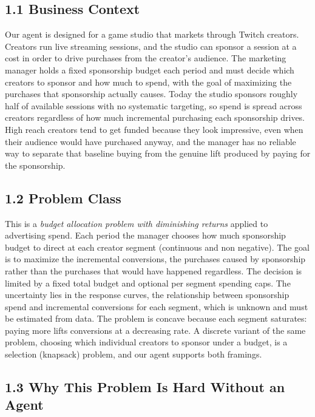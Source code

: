 \documentclass[11pt]{article}
\begin{document}

\subsection*{1.1 \; Business Context}

Our agent is designed for a game studio that markets through Twitch creators. Creators run live streaming sessions, and the studio can sponsor a session at a cost in order to drive purchases from the creator's audience. The marketing manager holds a fixed sponsorship budget each period and must decide which creators to sponsor and how much to spend, with the goal of maximizing the purchases that sponsorship actually causes. Today the studio sponsors roughly half of available sessions with no systematic targeting, so spend is spread across creators regardless of how much incremental purchasing each sponsorship drives. High reach creators tend to get funded because they look impressive, even when their audience would have purchased anyway, and the manager has no reliable way to separate that baseline buying from the genuine lift produced by paying for the sponsorship.

\subsection*{1.2 \; Problem Class}

This is a \emph{budget allocation problem with diminishing returns} applied to advertising spend. Each period the manager chooses how much sponsorship budget to direct at each creator segment (continuous and non negative). The goal is to maximize the incremental conversions, the purchases caused by sponsorship rather than the purchases that would have happened regardless. The decision is limited by a fixed total budget and optional per segment spending caps. The uncertainty lies in the response curves, the relationship between sponsorship spend and incremental conversions for each segment, which is unknown and must be estimated from data. The problem is concave because each segment saturates: paying more lifts conversions at a decreasing rate. A discrete variant of the same problem, choosing which individual creators to sponsor under a budget, is a selection (knapsack) problem, and our agent supports both framings.

\subsection*{1.3 \; Why This Problem Is Hard Without an Agent}
\end{document}
